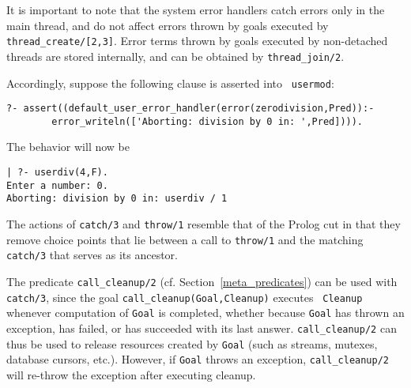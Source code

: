 It is important to note that the system error handlers catch errors
only in the main thread, and do not affect errors thrown by goals
executed by {\tt thread\_create/[2,3]}.  Error terms thrown by goals
executed by non-detached threads are stored internally, and can be
obtained by {\tt thread\_join/2}.

Accordingly, suppose the following clause is asserted into {\tt
usermod}:
%
\begin{small}
\begin{verbatim}
?- assert((default_user_error_handler(error(zerodivision,Pred)):- 
        error_writeln(['Aborting: division by 0 in: ',Pred]))).
\end{verbatim}
\end{small}
%
The behavior will now be
\begin{small}
\begin{verbatim}
| ?- userdiv(4,F).
Enter a number: 0.
Aborting: division by 0 in: userdiv / 1
\end{verbatim}
\end{small}
The actions of {\tt catch/3} and {\tt throw/1} resemble that of the
Prolog cut in that they remove choice points that lie between a call
to {\tt throw/1} and the matching {\tt catch/3} that serves as its
ancestor. 


The predicate {\tt call\_cleanup/2}
(cf. Section~\ref{meta_predicates}) can be used with {\tt catch/3},
since the goal {\tt call\_cleanup(Goal,Cleanup)} executes {\tt
  Cleanup} whenever computation of {\tt Goal} is completed, whether
because {\tt Goal} has thrown an exception, has failed, or has
succeeded with its last answer.  {\tt call\_cleanup/2} can thus be
used to release resources created by {\tt Goal} (such as streams,
mutexes, database cursors, etc.).  However, if {\tt Goal} throws an
exception, {\tt call\_cleanup/2} will re-throw the exception after
executing cleanup.

